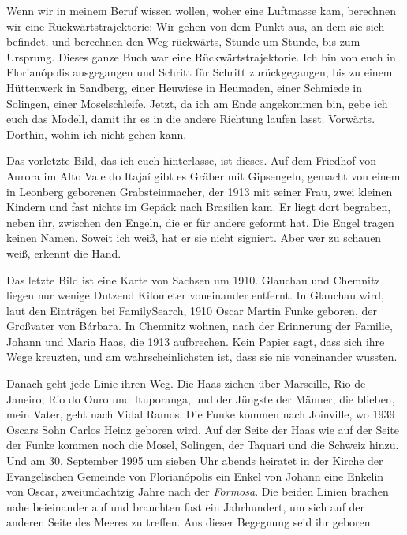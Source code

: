 \documentclass[
  ngerman,
  11pt,
  openany]{book}
\begin{document}
Wenn wir in meinem Beruf wissen wollen, woher eine Luftmasse kam,
berechnen wir eine Rückwärtstrajektorie: Wir gehen von dem Punkt aus, an
dem sie sich befindet, und berechnen den Weg rückwärts, Stunde um
Stunde, bis zum Ursprung. Dieses ganze Buch war eine
Rückwärtstrajektorie. Ich bin von euch in Florianópolis ausgegangen und
Schritt für Schritt zurückgegangen, bis zu einem Hüttenwerk in Sandberg,
einer Heuwiese in Heumaden, einer Schmiede in Solingen, einer
Moselschleife. Jetzt, da ich am Ende angekommen bin, gebe ich euch das
Modell, damit ihr es in die andere Richtung laufen lasst. Vorwärts.
Dorthin, wohin ich nicht gehen kann.

Das vorletzte Bild, das ich euch hinterlasse, ist dieses. Auf dem
Friedhof von Aurora im Alto Vale do Itajaí gibt es Gräber mit
Gipsengeln, gemacht von einem in Leonberg geborenen Grabsteinmacher, der
1913 mit seiner Frau, zwei kleinen Kindern und fast nichts im Gepäck
nach Brasilien kam. Er liegt dort begraben, neben ihr, zwischen den
Engeln, die er für andere geformt hat. Die Engel tragen keinen Namen.
Soweit ich weiß, hat er sie nicht signiert. Aber wer zu schauen weiß,
erkennt die Hand.

Das letzte Bild ist eine Karte von Sachsen um 1910. Glauchau und
Chemnitz liegen nur wenige Dutzend Kilometer voneinander entfernt. In
Glauchau wird, laut den Einträgen bei FamilySearch, 1910 Oscar Martin
Funke geboren, der Großvater von Bárbara. In Chemnitz wohnen, nach der
Erinnerung der Familie, Johann und Maria Haas, die 1913 aufbrechen. Kein
Papier sagt, dass sich ihre Wege kreuzten, und am wahrscheinlichsten
ist, dass sie nie voneinander wussten.

Danach geht jede Linie ihren Weg. Die Haas ziehen über Marseille, Rio de
Janeiro, Rio do Ouro und Ituporanga, und der Jüngste der Männer, die
blieben, mein Vater, geht nach Vidal Ramos. Die Funke kommen nach
Joinville, wo 1939 Oscars Sohn Carlos Heinz geboren wird. Auf der Seite
der Haas wie auf der Seite der Funke kommen noch die Mosel, Solingen,
der Taquari und die Schweiz hinzu. Und am 30. September 1995 um sieben
Uhr abends heiratet in der Kirche der Evangelischen Gemeinde von
Florianópolis ein Enkel von Johann eine Enkelin von Oscar,
zweiundachtzig Jahre nach der \emph{Formosa}. Die beiden Linien brachen
nahe beieinander auf und brauchten fast ein Jahrhundert, um sich auf der
anderen Seite des Meeres zu treffen. Aus dieser Begegnung seid ihr
geboren.
\end{document}
